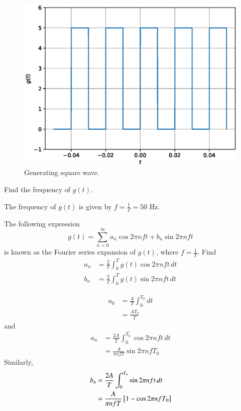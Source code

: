 \documentclass[journal,12pt,twocolumn]{IEEEtran}
\begin{document}
%
\begin{figure}[!h]
\centering

\includegraphics[width=\columnwidth]{./figs/1.1.eps}
\caption{Generating square wave.}
\label{fig:1.1}
\end{figure}
%
\begin{problem}
Find the frequency of $g(t)$.
\end{problem}
%
\solution
The frequency of $g(t)$ is given by $f = \frac{1}{T} = 50$ Hz.
\begin{problem}
The following expression
%
\begin{equation}
g(t) = \sum_{n=0}^{\infty}a_n\cos 2\pi n f t + b_n \sin 2 \pi n f t
\end{equation}
is known as the Fourier series expansion of $g(t)$, where $f = \frac{1}{T}$.  Find 
\begin{align}
a_n &= \frac{2}{T} \int_{0}^{T}g(t) \cos 2\pi nf t \, dt \\
b_n &= \frac{2}{T} \int_{0}^{T}g(t) \sin 2\pi nf t \, dt
\end{align}
\end{problem}
%
\solution 
\begin{align}
a_0 &= \frac{A}{T} \int_{0}^{T_0}  dt \\
&= \frac{AT_0}{T}
\end{align}
and
\begin{align}
a_n &= \frac{2A}{T} \int_{0}^{T_0}\cos 2\pi nf t \,  dt \\
&= \frac{A}{\pi n f T }\sin 2\pi n f T_0
\end{align}
Similarly, 
\begin{align}
b_n &= \frac{2A}{T} \int_{0}^{T_0}\sin 2\pi nf t \,  dt \\
&= \frac{A}{\pi n f T }{}\left[1 - \cos 2\pi n f T_0\right]
\end{align}
\end{document}
